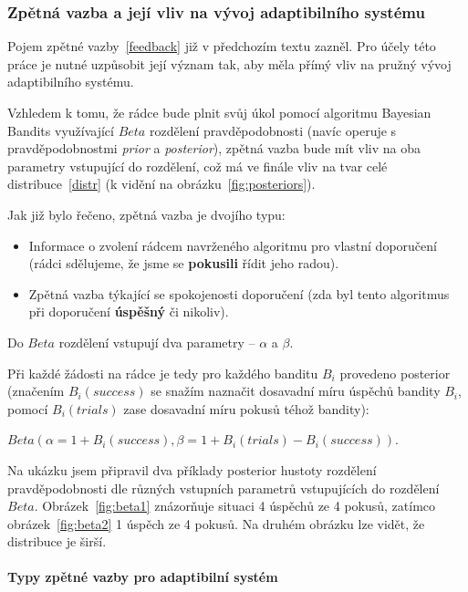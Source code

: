 \documentclass[thesis=M,czech]{FITthesis}[2014/05/07]
\begin{document}
\subsubsection{Zpětná vazba a její vliv na vývoj adaptibilního systému}
\label{subsub:feedback}
Pojem zpětné vazby~\ref{feedback} již v předchozím textu zazněl. Pro účely této práce je nutné uzpůsobit její význam tak, aby měla přímý vliv na pružný vývoj adaptibilního systému.

Vzhledem k tomu, že rádce bude plnit svůj úkol pomocí algoritmu Bayesian Bandits využívající ${Beta}$ rozdělení pravděpodobnosti (navíc operuje s pravděpodobnostmi \emph{prior} a \emph{posterior}), zpětná vazba bude mít vliv na oba parametry vstupující do rozdělení, což má ve finále vliv na tvar celé distribuce~\ref{distr} (k vidění na obrázku~\ref{fig:posteriors}). 

Jak již bylo řečeno, zpětná vazba je dvojího typu:

\begin{itemize}
	\item Informace o zvolení rádcem navrženého algoritmu pro vlastní doporučení (rádci sdělujeme, že jsme se \textbf{pokusili} řídit jeho radou).
	\item Zpětná vazba týkající se spokojenosti doporučení (zda byl tento algoritmus při doporučení \textbf{úspěšný} či nikoliv).
\end{itemize}

Do ${Beta}$ rozdělení vstupují dva parametry – $\alpha$ a $\beta$.

Při každé žádosti na rádce je tedy pro každého banditu $B_i$ provedeno posterior (značením $B_i(success)$ se snažím naznačit dosavadní míru úspěchů bandity $B_i$, pomocí $B_i(trials)$ zase dosavadní míru pokusů téhož bandity):

\begin{center}
${Beta}(\alpha = 1 + B_i(success), \beta = 1 + B_i(trials) - B_i(success))$.
\end{center}

Na ukázku jsem připravil dva příklady posterior hustoty rozdělení pravděpodobnosti dle různých vstupních parametrů vstupujících do rozdělení ${Beta}$. Obrázek~\ref{fig:beta1} znázorňuje situaci 4 úspěchů ze 4 pokusů, zatímco obrázek~\ref{fig:beta2} 1 úspěch ze 4 pokusů. Na druhém obrázku lze vidět, že distribuce je širší.

\paragraph{Typy zpětné vazby pro adaptibilní systém}
\end{document}
